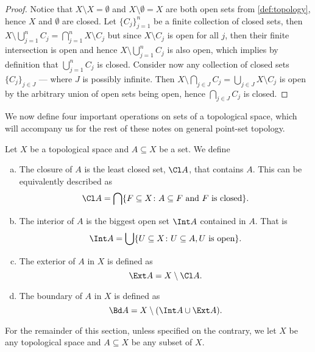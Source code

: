 \begin{proof}
Notice that \(X \setminus X = \emptyset\) and \(X \setminus \emptyset = X\) are
both open sets from \cref{def:topology}, hence \(X\) and \(\emptyset\) are
closed. Let \(\{C_{j}\}_{j=1}^n\) be a finite collection of closed sets, then
\(X \setminus \bigcup_{j=1}^n C_j = \bigcap_{j=1}^n X \setminus C_j\) but since
\(X \setminus C_j\) is open for all \(j\), then their finite intersection is
open and hence \(X \setminus \bigcup_{j=1}^n C_j\) is also open, which implies
by definition that \(\bigcup_{j=1}^n C_j\) is closed. Consider now any
collection of closed sets \(\{C_{j}\}_{j \in J}\) --- where \(J\) is possibly
infinite. Then \(X \setminus \bigcap_{j \in J} C_j = \bigcup_{j \in J} X
\setminus C_j\) is open by the arbitrary union of open sets being open, hence
\(\bigcap_{j \in J} C_j\) is closed.
\end{proof}

We now define four important operations on sets of a topological space, which
will accompany us for the rest of these notes on general point-set topology.

\begin{definition}
Let \(X\) be a topological space and \(A \subseteq X\) be a set. We define
\begin{enumerate}[(a)]\setlength\itemsep{0em}
\item\label{def: closure}
  The closure of \(A\) is the least closed set, \(\Cl A\), that
  contains \(A\). This can be equivalently described as
  \[
    \Cl A = \bigcap \{F \subseteq X \colon A \subseteq F \text{ and } F
    \text{ is closed}\}.
  \]

\item\label{def: interior}
  The interior of \(A\) is the biggest open set \(\Int A\) contained in
  \(A\). That is
    \[
      \Int A = \bigcup \{U \subseteq X \colon U \subseteq A, U \text{ is open}\}.
  \]

\item\label{def: exterior}
  The exterior of \(A\) in \(X\) is defined as
  \[
    \Ext A = X \setminus \Cl A.
  \]

\item\label{def: boundary}
  The boundary of \(A\) in \(X\) is defined as
  \[
    \Bd A = X \setminus (\Int A \cup \Ext A).
  \]
\end{enumerate}
\end{definition}

\begin{remark}
For the remainder of this section, unless specified on the contrary, we let
\(X\) be any topological space and \(A \subseteq X\) be any subset of \(X\).
\end{remark}

